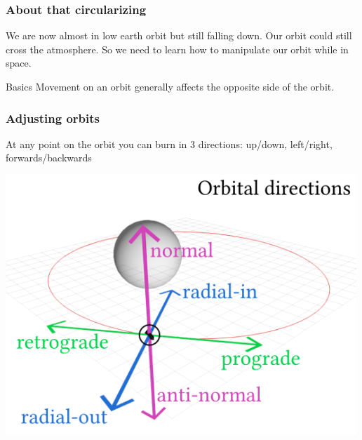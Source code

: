 {
%
\begin{frame}
\end{frame}
\begin{frame}
    \frametitle{About that circularizing}
    \begin{block}{}
        We are now almost in low earth orbit but still falling down. Our orbit could still cross the atmosphere.
        So we need to learn how to manipulate our orbit while in space.
    \end{block}
    \begin{block}{Basics}
        Movement on an orbit generally affects the opposite side of the orbit.
    \end{block}
\end{frame}
\begin{frame}
    \frametitle{Adjusting orbits}
    \begin{block}{}
        \begin{center}
            At any point on the orbit you can burn in 3 directions: up/down, left/right, forwards/backwards
        \end{center}
    \end{block}
    \begin{block}{}
        \begin{center}
            \includegraphics[scale=0.4]{images/maneuver_node}

\end{center}
\end{block}
\end{frame}}

